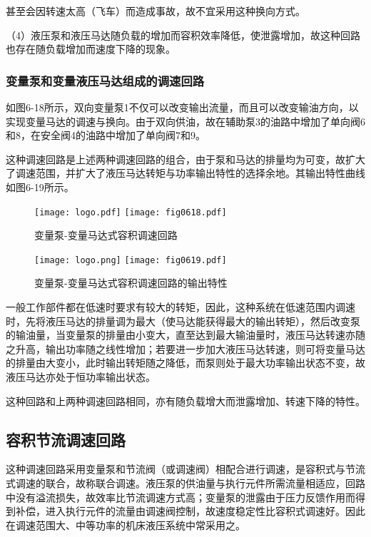 




甚至会因转速太高（飞车）而造成事故，故不宜采用这种换向方式。

（4）液压泵和液压马达随负载的增加而容积效率降低，使泄露增加，故这种回路也存在随负载增加而速度下降的现象。

\subsubsection{变量泵和变量液压马达组成的调速回路}

如图6-18所示，双向变量泵1不仅可以改变输出流量，而且可以改变输油方向，以实现变量马达的调速与换向。由于双向供油，故在辅助泵3的油路中增加了单向阀6和8，在安全阀4的油路中增加了单向阀7和9。

这种调速回路是上述两种调速回路的组合，由于泵和马达的排量均为可变，故扩大了调速范围，并扩大了液压马达转矩与功率输出特性的选择余地。其输出特性曲线如图6-19所示。

\begin{figure}
\centering
\ifOpenSource
\texttt{[image: logo.pdf]}
\else
\texttt{[image: fig0618.pdf]}%
\fi
\caption{变量泵-变量马达式容积调速回路}
\label{fig:fig0618}%
\end{figure}

\begin{figure}
\centering
\ifOpenSource
\texttt{[image: logo.png]}
\else
\texttt{[image: fig0619.pdf]}%
\fi
\caption{变量泵-变量马达式容积调速回路的输出特性}
\label{fig:fig0619}%
\end{figure}

一般工作部件都在低速时要求有较大的转矩，因此，这种系统在低速范围内调速时，先将液压马达的排量调为最大（使马达能获得最大的输出转矩），然后改变泵的输油量，当变量泵的排量由小变大，直至达到最大输油量时，液压马达转速亦随之升高，输出功率随之线性增加；若要进一步加大液压马达转速，则可将变量马达的排量由大变小，此时输出转矩随之降低，而泵则处于最大功率输出状态不变，故液压马达亦处于恒功率输出状态。

这种回路和上两种调速回路相同，亦有随负载增大而泄露增加、转速下降的特性。

\subsection{容积节流调速回路}
这种调速回路采用变量泵和节流阀（或调速阀）相配合进行调速，是容积式与节流式调速的联合，故称联合调速。液压泵的供油量与执行元件所需流量相适应，回路中没有溢流损失，故效率比节流调速方式高；变量泵的泄露由于压力反馈作用而得到补偿，进入执行元件的流量由调速阀控制，故速度稳定性比容积式调速好。因此在调速范围大、中等功率的机床液压系统中常采用之。

